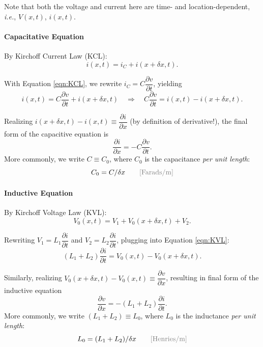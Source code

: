 \documentclass[12pt,a4paper]{article}
\begin{document}
Note that both the voltage and current here are time- and location-dependent, \textit{i.e.}, $V(x, t)$, $i(x, t)$.

\paragraph{Capacitative Equation}
By Kirchoff Current Law (KCL):
\begin{equation}
\label{eqn:KCL}
    i(x, t) = i_C + i(x+\delta x, t).
\end{equation}

With Equation \ref{eqn:KCL}, we rewrite $i_C = C \dfrac{\partial v}{\partial t}$, yielding
\begin{equation}
    i(x, t) = C \dfrac{\partial v}{\partial t} + i(x+\delta x, t)
    \quad \Rightarrow \quad
    C \dfrac{\partial v}{\partial t}  = i(x, t) - i(x+\delta x, t).
\end{equation}

Realizing $i(x+\delta x, t) - i(x, t) \equiv \dfrac{\partial i}{\partial x}$ (by definition of derivative!), the final form of the capacitive equation is
\begin{equation}
\label{eqn:capacitative}
\boxed{
    \frac{\partial i}{\partial x} = -C \frac{\partial v}{\partial t}.
}
\end{equation}
More commonly, we write $C \equiv C_0$, where $C_0$ is the capacitance \textit{per unit length}:
\[
    C_0 = C/\delta x \quad \quad {\color{gray} \rm [Farads/m]}
\]


\paragraph{Inductive Equation}    
By Kirchoff Voltage Law (KVL):
\begin{equation}
\label{eqn:KVL}
     V_0(x, t) = V_1 + V_0(x+\delta x, t) + V_2.
\end{equation}

Rewriting $V_1 = L_1 \dfrac{\partial i}{\partial t}$ and $V_2 = L_2 \dfrac{\partial i}{\partial t}$, plugging into Equation \ref{eqn:KVL}:
\begin{equation}
    (L_1 + L_2)\dfrac{\partial i}{\partial t} = V_0(x, t) - V_0(x+\delta x, t).
\end{equation}

Similarly, realizing $V_0(x+\delta x, t) - V_0(x, t) \equiv \dfrac{\partial v}{\partial x}$, resulting in final form of the inductive equation
\begin{equation}
\label{eqn:inductive}
\boxed{
     \frac{\partial v}{\partial x} = -(L_1+L_2) \frac{\partial i}{\partial t}.
}
\end{equation}
More commonly, we write $(L_1+L_2) \equiv L_0$, where $L_0$ is the inductance \textit{per unit length}:
\[
    L_0 = (L_1+L_2)/\delta x \quad \quad {\color{gray} \rm [Henries/m]}
\]
\end{document}
